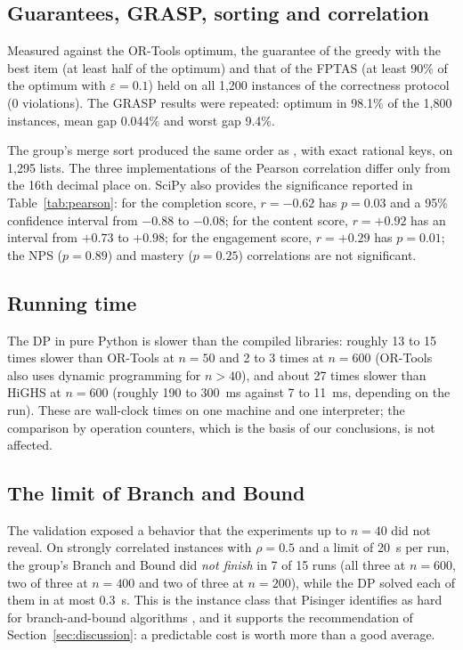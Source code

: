\subsection{Guarantees, GRASP, sorting and correlation}

Measured against the OR-Tools optimum, the guarantee of the greedy with the best item (at least half of the optimum) and that of the FPTAS (at least 90\% of the optimum with $\varepsilon=0.1$) held on all 1,200 instances of the correctness protocol (0 violations). The GRASP results were repeated: optimum in 98.1\% of the 1,800 instances, mean gap 0.044\% and worst gap 9.4\%.

The group's merge sort produced the same order as , with exact rational keys, on 1,295 lists. The three implementations of the Pearson correlation differ only from the 16th decimal place on. SciPy also provides the significance reported in Table~\ref{tab:pearson}: for the completion score, $r=-0.62$ has $p=0.03$ and a 95\% confidence interval from $-0.88$ to $-0.08$; for the content score, $r=+0.92$ has an interval from $+0.73$ to $+0.98$; for the engagement score, $r=+0.29$ has $p=0.01$; the NPS ($p=0.89$) and mastery ($p=0.25$) correlations are not significant.

\subsection{Running time}

The DP in pure Python is slower than the compiled libraries: roughly 13 to 15 times slower than OR-Tools at $n=50$ and 2 to 3 times at $n=600$ (OR-Tools also uses dynamic programming for $n>40$), and about 27 times slower than HiGHS at $n=600$ (roughly 190 to 300~ms against 7 to 11~ms, depending on the run). These are wall-clock times on one machine and one interpreter; the comparison by operation counters, which is the basis of our conclusions, is not affected.

\subsection{The limit of Branch and Bound}

The validation exposed a behavior that the experiments up to $n=40$ did not reveal. On strongly correlated instances with $\rho=0.5$ and a limit of 20~s per run, the group's Branch and Bound did \emph{not finish} in 7 of 15 runs (all three at $n=600$, two of three at $n=400$ and two of three at $n=200$), while the DP solved each of them in at most 0.3~s. This is the instance class that Pisinger identifies as hard for branch-and-bound algorithms \cite{pisinger2005}, and it supports the recommendation of Section~\ref{sec:discussion}: a predictable cost is worth more than a good average.

